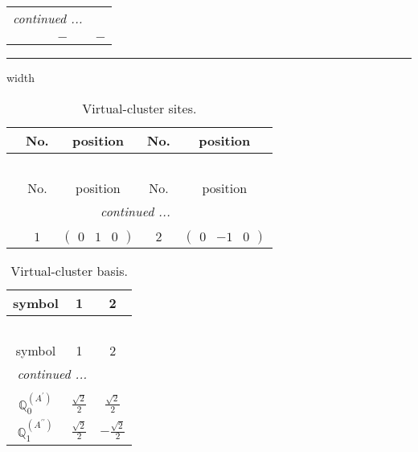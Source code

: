 \documentclass[fleqn,10pt,landscape]{article}
\begin{document}
\begin{itemize}
\begin{center}
\begin{longtable}{ccc}
 \hline \hline
\multicolumn{2}{r}{\footnotesize\it continued ...} \\ \endfoot

 \hline \hline
\multicolumn{2}{r}{} \\ \endlastfoot

$  $ & $ - $ & $ - $ \\
\end{longtable}
\end{center}

 \hfil \hrule height 1mm width \textwidth \hfil

{
\scriptsize
\begin{center}
\renewcommand{\arraystretch}{1.7}
\begin{longtable}{ccccc}
\caption{Virtual-cluster sites.}
 \\
 \hline \hline
 & No. & position & No. & position \\ \hline \endfirsthead

\multicolumn{4}{l}{\tablename\ \thetable{}} \\
 \hline \hline
 & No. & position & No. & position \\ \hline \endhead

 \hline \hline
\multicolumn{4}{r}{\footnotesize\it continued ...} \\ \endfoot

 \hline \hline
\multicolumn{4}{r}{} \\ \endlastfoot

 & $ 1 $ & $ \begin{pmatrix} 0 & 1 & 0 \end{pmatrix} $ & $ 2 $ & $ \begin{pmatrix} 0 & -1 & 0 \end{pmatrix} $ \\
\end{longtable}
\end{center}
\begin{center}
\renewcommand{\arraystretch}{1.7}
\begin{longtable}{ccc}
\caption{Virtual-cluster basis.}
 \\
 \hline \hline
symbol & 1 & 2 \\ \hline \endfirsthead

\multicolumn{2}{l}{\tablename\ \thetable{}} \\
 \hline \hline
symbol & 1 & 2 \\ \hline \endhead

 \hline \hline
\multicolumn{2}{r}{\footnotesize\it continued ...} \\ \endfoot

 \hline \hline
\multicolumn{2}{r}{} \\ \endlastfoot

$\mathbb{Q}_{0}^{(A^{\prime})}$ & $ \frac{\sqrt{2}}{2} $ & $ \frac{\sqrt{2}}{2} $ \\ \hline
$\mathbb{Q}_{1}^{(A^{\prime\prime})}$ & $ \frac{\sqrt{2}}{2} $ & $ - \frac{\sqrt{2}}{2} $ \\
\end{longtable}
\end{center}
}
\end{itemize}
\end{document}
